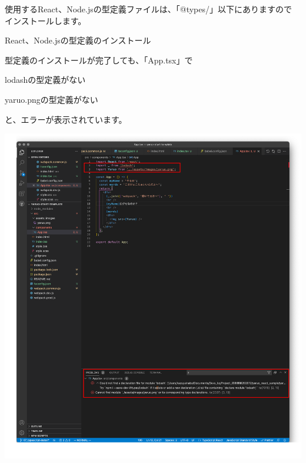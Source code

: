 \vspace*{\baselineskip}

使用するReact、Node.jsの型定義ファイルは、「@types/」以下にありますので
インストールします。

\def\startercodeblockfontsize{}
\begin{starterterminal}[]{React、Node.jsの型定義のインストール}\end{starterterminal}

型定義のインストールが完了しても、「App.tsx」で

\begin{starteritemize}
\item lodashの型定義がない
\item yaruo.pngの型定義がない
\end{starteritemize}

と、エラーが表示されています。

\begin{reviewimage}%
\includegraphics[width=0.7\maxwidth]{./images/02-create-react-app/typescript02.png}%
\label{image:02-create-react-app:typescript02}
\end{reviewimage}

